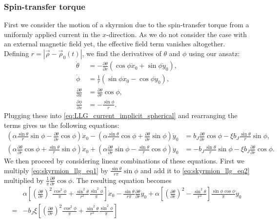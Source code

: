 \documentclass[12pt, a4paper]{article}		%
\numberwithin{equation}{section}
\begin{document}
\subsubsection{Spin-transfer torque}
First we consider the motion of a skyrmion due to the spin-transfer torque from a uniformly applied current in the $x$-direction. As we do not consider the case with an external magnetic field yet, the effective field term vanishes altogether. Defining $r = |\vec{\rho}-\vec{\rho}_0(t)|$, we find the derivatives of $\theta$ and $\phi$ using our ansatz:
\begin{align}
\dot{\theta} &= -\frac{\partial\theta}{\partial r}(\cos\phi\dot{x}_0+\sin\phi\dot{y}_0), \\
\dot{\phi} &= \frac{1}{r}(\sin\phi\dot{x}_0-\cos\phi\dot{y}_0), \\
\frac{\partial \theta}{\partial x} &= \frac{\partial\theta}{\partial r} \cos\phi,\\
\frac{\partial\phi}{\partial x} &= -\frac{\sin\phi}{r}.
\end{align}
Plugging these into \eqref{eq:LLG_current_implicit_spherical} and rearranging the terms gives us the following equations:
\begin{align}
(\alpha\frac{\sin\theta}{r}\sin\phi-\frac{\partial\theta}{\partial r}\cos\phi)\dot{x}_0 - (\alpha\frac{\sin\theta}{r}\cos\phi+\frac{\partial\theta}{\partial r}\sin\phi)\dot{y}_0 &= b_J \frac{\partial\theta}{\partial r}\cos\phi - \xi b_J \frac{\sin\theta}{r}\sin\phi, \label{eq:skyrmion_llg_eq1}\\
(\alpha\frac{\partial\theta}{\partial r}\cos\phi + \frac{\sin\theta}{r}\sin\phi)\dot{x}_0 + (\alpha\frac{\partial\theta}{\partial r}\sin\phi - \frac{\sin\theta}{r}\cos\phi)\dot{y}_0 &= -b_J\frac{\sin\theta}{r}\sin\phi - \xi b_J \frac{\partial\theta}{\partial r}\cos\phi. \label{eq:skyrmion_llg_eq2}
\end{align}
We then proceed by considering linear combinations of these equations. First we multiply \eqref{eq:skyrmion_llg_eq1} by $\frac{\sin\theta}{r \pi}\sin\phi$ and add it to \eqref{eq:skyrmion_llg_eq2} multiplied by $\frac{1}{\pi}\frac{\partial\theta}{\partial r}\cos\phi$. The resulting equation becomes
\begin{align}
\nonumber &\alpha\left[ (\frac{\partial\theta}{\partial r})^2\frac{\cos^2\phi}{\pi} + \frac{\sin^2\theta}{r^2}\frac{\sin^2\phi}{\pi}\right] \dot{x}_0 - \frac{\sin\theta}{r \pi}\frac{\partial\theta}{\partial r}\dot{y}_0 
+ \alpha \left[(\frac{\partial\theta}{\partial r})^2-\frac{\sin^2\theta}{r^2}\right]\frac{\sin\phi\cos\phi}{\pi}\dot{y}_0 \\
= &-b_J\xi\left[ (\frac{\partial\theta}{\partial r})^2\frac{\cos^2\phi}{\pi} + \frac{\sin^2\theta}{r^2}\frac{\sin^2\phi}{\pi}\right]
\end{align}
\end{document}
